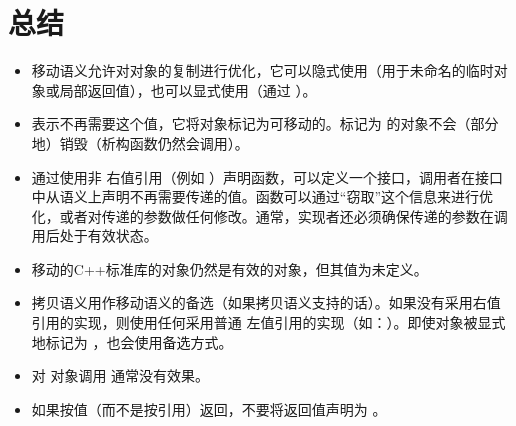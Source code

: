 \section{总结}
\begin{itemize}
	\item 移动语义允许对对象的复制进行优化，它可以隐式使用（用于未命名的临时对象或局部返回值），也可以显式使用（通过 ）。
	\item {} 表示不再需要这个值，它将对象标记为可移动的。标记为  的对象不会（部分地）销毁（析构函数仍然会调用）。
	\item 通过使用非  右值引用（例如 ）声明函数，可以定义一个接口，调用者在接口中从语义上声明不再需要传递的值。函数可以通过“窃取”这个信息来进行优化，或者对传递的参数做任何修改。通常，实现者还必须确保传递的参数在调用后处于有效状态。
	\item 移动的C++标准库的对象仍然是有效的对象，但其值为未定义。
	\item 拷贝语义用作移动语义的备选（如果拷贝语义支持的话）。如果没有采用右值引用的实现，则使用任何采用普通  左值引用的实现（如：）。即使对象被显式地标记为 ，也会使用备选方式。
	\item 对  对象调用  通常没有效果。
	\item 如果按值（而不是按引用）返回，不要将返回值声明为 。
\end{itemize}


